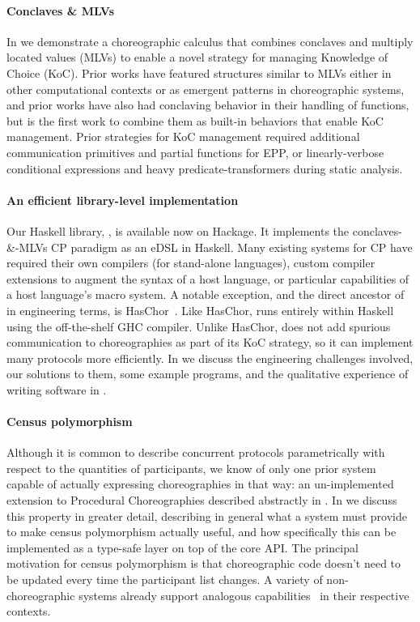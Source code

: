\paragraph{Conclaves \& MLVs}
In  we demonstrate a choreographic calculus \HLSCentral that combines conclaves and multiply located values (MLVs)
to enable a novel strategy for managing Knowledge of Choice (KoC).
Prior works have featured structures similar to MLVs either in other computational contexts or as emergent patterns in choreographic systems,
and prior works have also had conclaving behavior in their handling of functions,
but \HLSCentral is the first work to combine them as built-in behaviors that enable KoC management.
Prior strategies for KoC management required additional communication primitives and partial functions for EPP,
or linearly-verbose conditional expressions and heavy predicate-transformers during static analysis.

\paragraph{An efficient library-level implementation}
Our Haskell library, \MultiChor, is available now on Hackage.
It implements the conclaves-\&-MLVs CP paradigm as an eDSL in Haskell.
Many existing systems for CP have required their own compilers (for stand-alone languages),
custom compiler extensions to augment the syntax of a host language,
or particular capabilities of a host language's macro system.
A notable exception, and the direct ancestor of \MultiChor in engineering terms, is HasChor~\cite{shen-haschor}.
Like HasChor, \MultiChor runs entirely within Haskell using the off-the-shelf GHC compiler.
Unlike HasChor, \MultiChor does not add spurious communication to choreographies as part of its KoC strategy,
so it can implement many protocols more efficiently.
In  we discuss the engineering challenges involved,
our solutions to them,
some example programs,
and the qualitative experience of writing software in \MultiChor.

\paragraph{Census polymorphism}
Although it is common to describe concurrent protocols parametrically with respect to the quantities of participants,
we know of only one prior system capable of actually expressing choreographies in that way:
an un-implemented extension to Procedural Choreographies described abstractly in \cite{cp_practice_cruz_filipe_montesi}.
In  we discuss this property in greater detail,
describing in general what a system must provide to make census polymorphism actually useful,
and how specifically this can be implemented as a type-safe layer on top of the core \MultiChor API.
The principal motivation for census polymorphism is that choreographic code doesn't need to be updated every time the participant list changes.
A variety of non-choreographic systems already support analogous
capabilities~\cite{leBrun2025,scalaLoci,jongmans1cp2025,wysteria,Sweet_2023}
in their respective contexts.

